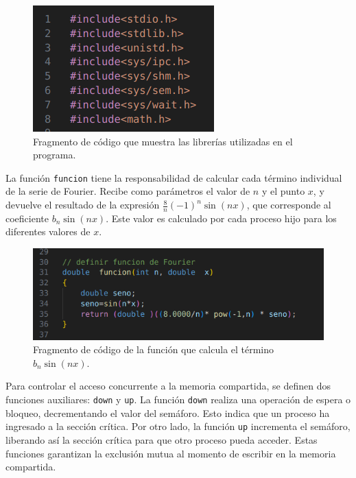 {\begin{figure}[H]
    \centering
    \includegraphics[width=0.8\linewidth]{Figures/codigo/librerias.png}
    \caption[Librerías utilizadas en el programa]{Fragmento de código que muestra las librerías utilizadas en el programa.}
    \label{fig:codigo-funcion}
\end{figure}


La función \texttt{funcion} tiene la responsabilidad de calcular cada término individual de la serie de Fourier. Recibe como parámetros el valor de \( n \) y el punto \( x \), y devuelve el resultado de la expresión \( \frac{8}{n} (-1)^n \sin(nx) \), que corresponde al coeficiente \( b_n \sin(nx) \). Este valor es calculado por cada proceso hijo para los diferentes valores de \( x \).

\begin{figure}[H]
    \centering
    \includegraphics[width=0.8\linewidth]{Figures/codigo/funcion.png}
    \caption[Función para calcular \(b_n \sin(nx)\)]{Fragmento de código de la función que calcula el término \(b_n \sin(nx)\).}
    \label{fig:codigo-funcion}
\end{figure}

Para controlar el acceso concurrente a la memoria compartida, se definen dos funciones auxiliares: \texttt{down} y \texttt{up}. La función \texttt{down} realiza una operación de espera o bloqueo, decrementando el valor del semáforo. Esto indica que un proceso ha ingresado a la sección crítica. Por otro lado, la función \texttt{up} incrementa el semáforo, liberando así la sección crítica para que otro proceso pueda acceder. Estas funciones garantizan la exclusión mutua al momento de escribir en la memoria compartida.

}
